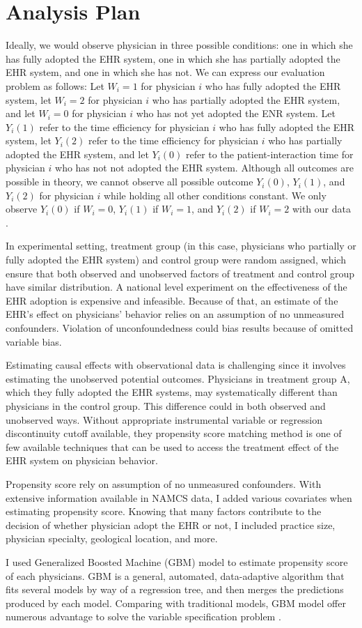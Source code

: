 \section{Analysis Plan}
Ideally, we would observe physician in three possible conditions: one in which she has fully adopted the EHR system, one in which she has partially adopted the EHR system, and one in which she has not. We can express our evaluation problem as follows: Let $W_i = 1$ for physician $i$ who has fully adopted the EHR system, let $W_i = 2$ for physician $i$ who has partially adopted the EHR system, and let $W_i = 0$ for physician $i$ who has not yet adopted the ENR system. Let $Y_i(1)$ refer to the time efficiency for physician $i$ who has fully adopted the EHR system, let $Y_i(2)$ refer to the time efficiency for physician $i$ who has partially adopted the EHR system, and let $Y_i(0)$ refer to the patient-interaction time for physician $i$ who has not not adopted the EHR system. Although all outcomes are possible in theory, we cannot observe all possible outcome $Y_i(0)$, $Y_i(1)$, and $Y_i(2)$ for physician $i$ while holding all other conditions constant. We only observe $Y_i(0)$ if $W_i = 0$, $Y_i(1)$ if $W_i = 1$, and $Y_i(2)$ if $W_i = 2$ with our data \citep{imbens2008recent}.

In experimental setting, treatment group (in this case, physicians who partially or fully adopted the EHR system) and control group were random assigned, which ensure that both observed and unobserved factors of treatment and control group have similar distribution. A national level experiment on the effectiveness of the EHR adoption is expensive and infeasible. Because of that, an estimate of the EHR's effect on physicians' behavior relies on an assumption of no unmeasured confounders. Violation of unconfoundedness could bias results because of omitted variable bias.

Estimating causal effects with observational data is challenging since it involves estimating the unobserved potential outcomes. Physicians in treatment group A, which they fully adopted the EHR systems, may systematically different than physicians in the control group. This difference could in both observed and unobserved ways. Without appropriate instrumental variable or regression discontinuity cutoff available, they propensity score matching method is one of few available techniques that can be used to access the treatment effect of the EHR system on physician behavior.

Propensity score rely on assumption of no unmeasured confounders. With extensive information available in NAMCS data, I added various covariates when estimating propensity score. Knowing that many factors contribute to the decision of whether physician adopt the EHR or not, I included practice size, physician specialty, geological location, and more. 

I used Generalized Boosted Machine (GBM) model to estimate propensity score of each physicians. GBM is a general, automated, data-adaptive algorithm that fits several models by way of a regression tree, and then merges the predictions produced by each model. Comparing with traditional models, GBM model offer numerous advantage to solve the variable specification problem \citep{guo2009propensity}. 
